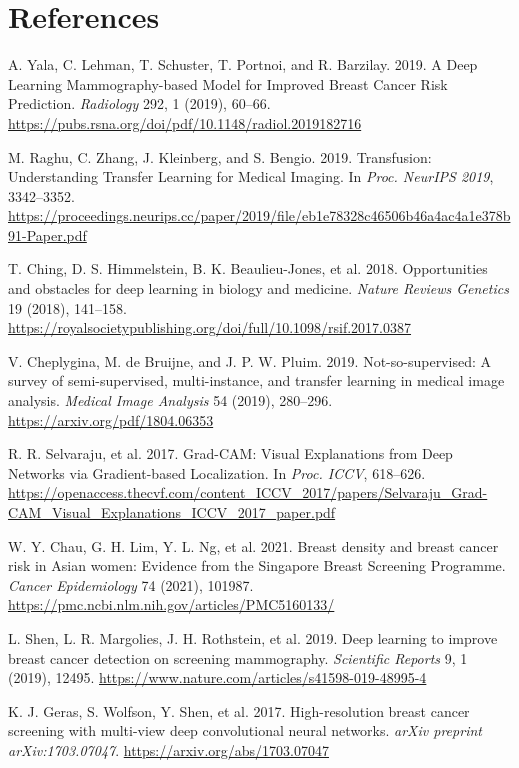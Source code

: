\documentclass[12pt]{article}
\begin{document}
\section{References}
\begin{thebibliography}{99}

    A. Yala, C. Lehman, T. Schuster, T. Portnoi, and R. Barzilay. 2019. A Deep Learning Mammography-based Model for Improved Breast Cancer Risk Prediction. \textit{Radiology} 292, 1 (2019), 60–66. \url{https://pubs.rsna.org/doi/pdf/10.1148/radiol.2019182716}
    
    M. Raghu, C. Zhang, J. Kleinberg, and S. Bengio. 2019. Transfusion: Understanding Transfer Learning for Medical Imaging. In \textit{Proc. NeurIPS 2019}, 3342–3352. \url{https://proceedings.neurips.cc/paper/2019/file/eb1e78328c46506b46a4ac4a1e378b91-Paper.pdf}
    
    T. Ching, D. S. Himmelstein, B. K. Beaulieu-Jones, et al. 2018. Opportunities and obstacles for deep learning in biology and medicine. \textit{Nature Reviews Genetics} 19 (2018), 141–158. \url{https://royalsocietypublishing.org/doi/full/10.1098/rsif.2017.0387}
    
    V. Cheplygina, M. de Bruijne, and J. P. W. Pluim. 2019. Not-so-supervised: A survey of semi-supervised, multi-instance, and transfer learning in medical image analysis. \textit{Medical Image Analysis} 54 (2019), 280–296. \url{https://arxiv.org/pdf/1804.06353}
    
    R. R. Selvaraju, et al. 2017. Grad-CAM: Visual Explanations from Deep Networks via Gradient-based Localization. In \textit{Proc. ICCV}, 618–626. \url{https://openaccess.thecvf.com/content_ICCV_2017/papers/Selvaraju_Grad-CAM_Visual_Explanations_ICCV_2017_paper.pdf}
    
    W. Y. Chau, G. H. Lim, Y. L. Ng, et al. 2021. Breast density and breast cancer risk in Asian women: Evidence from the Singapore Breast Screening Programme. \textit{Cancer Epidemiology} 74 (2021), 101987. \url{https://pmc.ncbi.nlm.nih.gov/articles/PMC5160133/}
    
    L. Shen, L. R. Margolies, J. H. Rothstein, et al. 2019. Deep learning to improve breast cancer detection on screening mammography. \textit{Scientific Reports} 9, 1 (2019), 12495. \url{https://www.nature.com/articles/s41598-019-48995-4}
    
    K. J. Geras, S. Wolfson, Y. Shen, et al. 2017. High-resolution breast cancer screening with multi-view deep convolutional neural networks. \textit{arXiv preprint arXiv:1703.07047}. \url{https://arxiv.org/abs/1703.07047}
    

\end{thebibliography}
\end{document}
